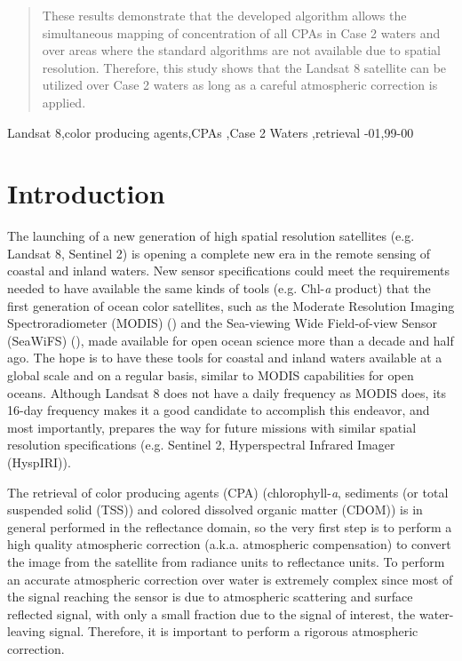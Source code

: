 \documentclass[onecolumn,3p,letterpaper]{elsarticle}
\begin{document}
\begin{frontmatter}
\begin{abstract}
These results demonstrate that the developed algorithm allows the simultaneous mapping of concentration of all CPAs in Case 2 waters and over areas where the standard algorithms are not available due to spatial resolution.
%
Therefore, this study shows that the Landsat 8 satellite can be utilized over Case 2 waters as long as a careful atmospheric correction is applied. 

\end{abstract}

\begin{keyword}
Landsat 8\sep color producing agents\sep CPAs \sep Case 2 Waters \sep retrieval
-01\sep  99-00
\end{keyword}

\end{frontmatter}
\section{Introduction}
The launching of a new generation of high spatial resolution satellites (e.g. Landsat 8, Sentinel 2) is opening a complete new era in the remote sensing of coastal and inland waters. New sensor specifications could meet the requirements needed to have available the same kinds of tools (e.g. Chl-{\it a} product) that the first generation of ocean color satellites, such as the Moderate Resolution Imaging Spectroradiometer (MODIS) (\cite{Esaias1998}) and the Sea-viewing Wide Field-of-view Sensor (SeaWiFS) (\cite{McClain2004}), made available for open ocean science more than a decade and half ago. The hope is to have these tools for coastal and inland waters available at a global scale and on a regular basis, similar to MODIS capabilities for open oceans. Although Landsat 8 does not have a daily frequency as MODIS does, its 16-day frequency makes it a good candidate to accomplish this endeavor, and most importantly, prepares the way for future missions with similar spatial resolution specifications (e.g. Sentinel 2, Hyperspectral Infrared Imager (HyspIRI)).

The retrieval of color producing agents (CPA) (chlorophyll-{\it a}, sediments (or total suspended solid (TSS)) and colored dissolved organic matter (CDOM)) is in general performed in the reflectance domain, so the very first step is to perform a high quality atmospheric correction (a.k.a. atmospheric compensation) to convert the image from the satellite from radiance units to reflectance units. To perform an accurate atmospheric correction over water is extremely complex since most of the signal reaching the sensor is due to atmospheric scattering and surface reflected signal, with only a small fraction due to the signal of interest, the water-leaving signal. Therefore, it is important to perform a rigorous atmospheric correction. 
\end{document}
